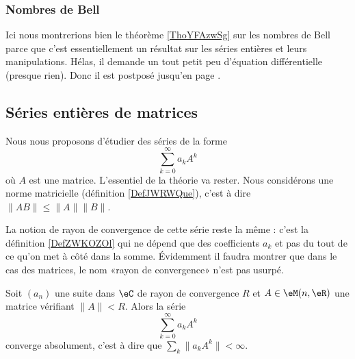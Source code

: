 \subsubsection{Nombres de Bell}

Ici nous montrerions bien le théorème \ref{ThoYFAzwSg} sur les nombres de Bell parce que c'est essentiellement un résultat sur les séries entières et leurs manipulations. Hélas, il demande un tout petit peu d'équation différentielle (presque rien). Donc il est postposé jusqu'en page \pageref{ThoYFAzwSg}.

\subsection{Séries entières de matrices}
\label{subsecEVnZXgf}

Nous nous proposons d'étudier des séries de la forme
\begin{equation}
    \sum_{k=0}^{\infty}a_kA^k
\end{equation}
où \( A\) est une matrice. L'essentiel de la théorie va rester. Nous considérons une norme matricielle (définition \ref{DefJWRWQue}), c'est à dire \( \| AB \|\leq \| A \|\| B \|\).

La notion de rayon de convergence de cette série reste la même : c'est la définition \ref{DefZWKOZOl} qui ne dépend que des coefficients \( a_k\) et pas du tout de ce qu'on met à côté dans la somme. Évidemment il faudra montrer que dans le cas des matrices, le nom «rayon de convergence» n'est pas usurpé.

\begin{proposition}
    Soit \( (a_n)\) une suite dans \( \eC\) de rayon de convergence \( R\) et \( A\in \eM(n,\eR)\) une matrice vérifiant \( \| A \|<R\). Alors la série
    \begin{equation}
        \sum_{k=0}^{\infty}a_kA^k
    \end{equation}
    converge absolument, c'est à dire que \( \sum_k\| a_kA^k \|<\infty\).
\end{proposition}

